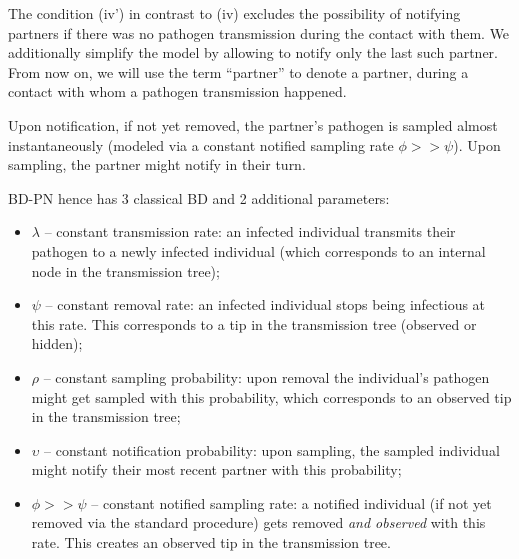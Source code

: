 \documentclass[10pt,letterpaper]{article}
\begin{document}
The condition (iv') in contrast to (iv) excludes the possibility of notifying partners if there was no pathogen transmission during the contact with them. We additionally simplify the model by allowing to notify only the last such partner. From now on, we will use the term ``partner'' to denote a partner, during a contact with whom a pathogen transmission happened.

Upon notification, if not yet removed,  the partner's pathogen is sampled almost instantaneously (modeled via a constant notified sampling rate $\phi >> \psi$). Upon sampling, the partner might notify in their turn. 

BD-PN hence has 3 classical BD and 2 additional parameters:
\begin{itemize}
 \item $\lambda$ -- constant transmission rate: an infected individual transmits their pathogen to a newly infected individual (which corresponds to an internal node in the transmission tree);
 \item $\psi$ -- constant removal rate: an infected individual stops being infectious at this rate. This corresponds to a tip in the transmission tree (observed or hidden);
 \item $\rho$ -- constant sampling probability: upon removal the individual's pathogen might get sampled with this probability, which corresponds to an observed tip in the transmission tree;
 \item $\upsilon$ -- constant notification probability: upon sampling, the sampled individual might notify their most recent partner with this probability;
 \item $\phi >> \psi$ -- constant notified sampling rate: a notified individual (if not yet removed via the standard procedure) gets removed \textit{and observed} with this rate. This creates an observed tip in the transmission tree. 
\end{itemize}
\end{document}
